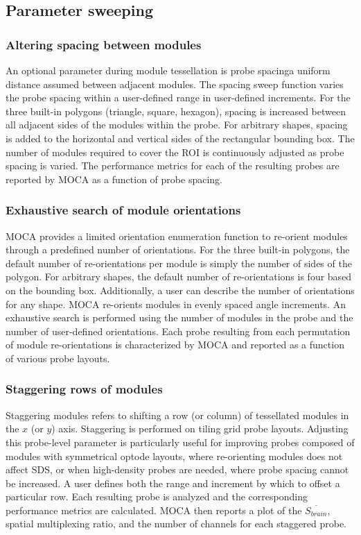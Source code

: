 \subsection{Parameter sweeping}
\subsubsection{Altering spacing between modules}
An optional parameter during module tessellation is probe spacing\textemdash a uniform distance assumed between adjacent modules. The spacing sweep function varies the probe spacing within a user-defined range in user-defined increments. For the three built-in polygons (triangle, square, hexagon), spacing is increased between all adjacent sides of the modules within the probe. For arbitrary shapes, spacing is added to the horizontal and vertical sides of the rectangular bounding box. The number of modules required to cover the \ac{ROI} is continuously adjusted as probe spacing is varied. The performance metrics for each of the resulting probes are reported by \ac{MOCA} as a function of probe spacing.

\subsubsection{Exhaustive search of module orientations}
\ac{MOCA} provides a limited orientation enumeration function to re-orient modules through a predefined number of orientations. For the three built-in polygons, the default number of re-orientations per module is simply the number of sides of the polygon. For arbitrary shapes, the default number of re-orientations is four based on the bounding box. Additionally, a user can describe the number of orientations for any shape. \ac{MOCA} re-orients modules in evenly spaced angle increments. An exhaustive search is performed using the number of modules in the probe and the number of user-defined orientations. Each probe resulting from each permutation of module re-orientations is characterized by \ac{MOCA} and reported as a function of various probe layouts.

\subsubsection{Staggering rows of modules}
Staggering modules refers to shifting a row (or column) of tessellated modules in the $x$ (or $y$) axis. Staggering is performed on tiling grid probe layouts. Adjusting this probe-level parameter is particularly useful for improving probes composed of modules with symmetrical optode layouts, where re-orienting modules does not affect \ac{SDS}, or when high-density probes are needed, where probe spacing cannot be increased. A user defines both the range and increment by which to offset a particular row. Each resulting probe is analyzed and the corresponding performance metrics are calculated. \ac{MOCA} then reports a plot of the $\overline{S_{brain}}$, spatial multiplexing ratio, and the number of channels for each staggered probe.


